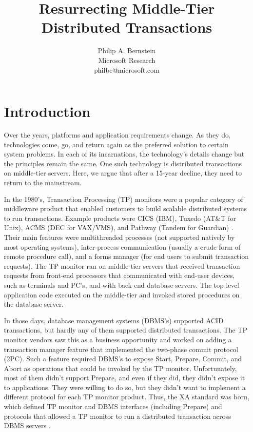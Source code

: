 \documentclass[11pt]{article}
\begin{document}
\title{Resurrecting Middle-Tier Distributed Transactions}
\author{Philip A. Bernstein\\Microsoft Research\\philbe@microsoft.com}


\maketitle

\section{Introduction}
Over the years, platforms and application requirements change. As they do, technologies come, go, and return again as the preferred solution to certain system problems. In each of its incarnations, the technology's details change but the principles remain the same. One such technology is distributed transactions on middle-tier servers. Here, we argue that after a 15-year decline, they need to return to the mainstream. 

In the 1980's, Transaction Processing (TP) monitors were a popular category of middleware product that enabled customers to build scalable distributed systems to run transactions. Example products were CICS (IBM), Tuxedo (AT\&T for Unix), ACMS (DEC for VAX/VMS), and Pathway (Tandem for Guardian) \cite{4}. Their main features were multithreaded processes (not supported natively by most operating systems), inter-process communication (usually a crude form of remote procedure call), and a forms manager (for end users to submit transaction requests). The TP monitor ran on middle-tier servers that received transaction requests from front-end processors that communicated with end-user devices, such as terminals and PC's, and with back end database servers. The top-level application code executed on the middle-tier and invoked stored procedures on the database server.  
 
In those days, database management systems (DBMS's) supported ACID transactions, but hardly any of them supported distributed transactions. The TP monitor vendors saw this as a business opportunity and worked on adding a transaction manager feature that implemented the two-phase commit protocol (2PC). Such a feature required DBMS's to expose Start, Prepare, Commit, and Abort as operations that could be invoked by the TP monitor. Unfortunately, most of them didn't support Prepare, and even if they did, they didn't expose it to applications. They were willing to do so, but they didn't want to implement a different protocol for each TP monitor product. Thus, the XA standard was born, which defined TP monitor and DBMS interfaces (including Prepare) and protocols that allowed a TP monitor to run a distributed transaction across DBMS servers \cite{18}. 
 
\end{document}
